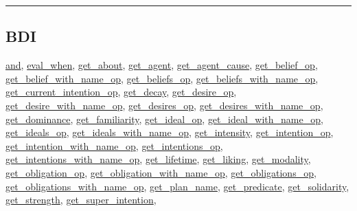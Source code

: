 \documentclass[]{book}
\theoremstyle{definition}
\theoremstyle{definition}
\theoremstyle{definition}
\theoremstyle{remark}
\begin{document}
\begin{center}\rule{0.5\linewidth}{\linethickness}\end{center}

\subsection{BDI}\label{bdi-4}

\href{OperatorsAA\#and}{and}, \href{OperatorsDH\#eval_when}{eval\_when},
\href{OperatorsDH\#get_about}{get\_about},
\href{OperatorsDH\#get_agent}{get\_agent},
\href{OperatorsDH\#get_agent_cause}{get\_agent\_cause},
\href{OperatorsDH\#get_belief_op}{get\_belief\_op},
\href{OperatorsDH\#get_belief_with_name_op}{get\_belief\_with\_name\_op},
\href{OperatorsDH\#get_beliefs_op}{get\_beliefs\_op},
\href{OperatorsDH\#get_beliefs_with_name_op}{get\_beliefs\_with\_name\_op},
\href{OperatorsDH\#get_current_intention_op}{get\_current\_intention\_op},
\href{OperatorsDH\#get_decay}{get\_decay},
\href{OperatorsDH\#get_desire_op}{get\_desire\_op},
\href{OperatorsDH\#get_desire_with_name_op}{get\_desire\_with\_name\_op},
\href{OperatorsDH\#get_desires_op}{get\_desires\_op},
\href{OperatorsDH\#get_desires_with_name_op}{get\_desires\_with\_name\_op},
\href{OperatorsDH\#get_dominance}{get\_dominance},
\href{OperatorsDH\#get_familiarity}{get\_familiarity},
\href{OperatorsDH\#get_ideal_op}{get\_ideal\_op},
\href{OperatorsDH\#get_ideal_with_name_op}{get\_ideal\_with\_name\_op},
\href{OperatorsDH\#get_ideals_op}{get\_ideals\_op},
\href{OperatorsDH\#get_ideals_with_name_op}{get\_ideals\_with\_name\_op},
\href{OperatorsDH\#get_intensity}{get\_intensity},
\href{OperatorsDH\#get_intention_op}{get\_intention\_op},
\href{OperatorsDH\#get_intention_with_name_op}{get\_intention\_with\_name\_op},
\href{OperatorsDH\#get_intentions_op}{get\_intentions\_op},
\href{OperatorsDH\#get_intentions_with_name_op}{get\_intentions\_with\_name\_op},
\href{OperatorsDH\#get_lifetime}{get\_lifetime},
\href{OperatorsDH\#get_liking}{get\_liking},
\href{OperatorsDH\#get_modality}{get\_modality},
\href{OperatorsDH\#get_obligation_op}{get\_obligation\_op},
\href{OperatorsDH\#get_obligation_with_name_op}{get\_obligation\_with\_name\_op},
\href{OperatorsDH\#get_obligations_op}{get\_obligations\_op},
\href{OperatorsDH\#get_obligations_with_name_op}{get\_obligations\_with\_name\_op},
\href{OperatorsDH\#get_plan_name}{get\_plan\_name},
\href{OperatorsDH\#get_predicate}{get\_predicate},
\href{OperatorsDH\#get_solidarity}{get\_solidarity},
\href{OperatorsDH\#get_strength}{get\_strength},
\href{OperatorsDH\#get_super_intention}{get\_super\_intention},
\end{document}
